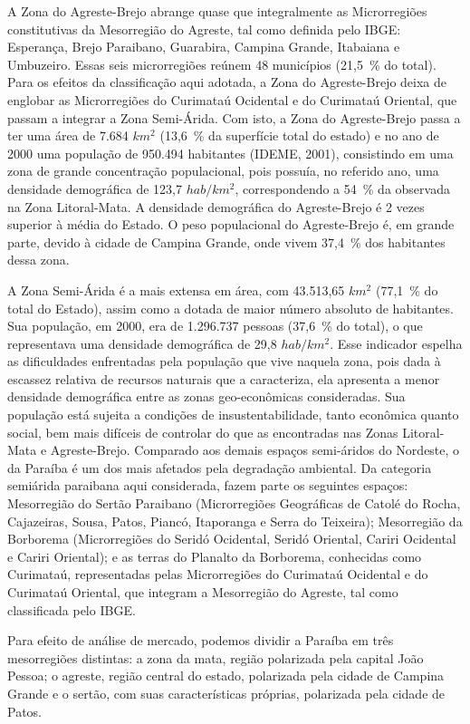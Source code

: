 	A Zona do Agreste-Brejo abrange quase que integralmente as Microrregiões constitutivas da Mesorregião do Agreste, tal como definida pelo IBGE: Esperança, Brejo Paraibano, Guarabira, Campina Grande, Itabaiana e Umbuzeiro. Essas seis microrregiões reúnem 48 municípios (21,5~\% do total). Para os efeitos da classificação aqui adotada, a Zona do Agreste-Brejo deixa de englobar as Microrregiões do Curimataú Ocidental e do Curimataú Oriental, que passam a integrar a Zona Semi-Árida. Com isto, a Zona do Agreste-Brejo passa a ter uma área de 7.684 $km^2$ (13,6~\% da superfície total do estado) e no ano de 2000 uma população de 950.494 habitantes (IDEME, 2001), consistindo em uma zona de grande concentração populacional, pois possuía, no referido ano, uma densidade demográfica de 123,7 $hab/km^2$, correspondendo a 54~\% da observada na Zona Litoral-Mata. A densidade demográfica do Agreste-Brejo é 2 vezes superior à média do Estado. O peso populacional do Agreste-Brejo é, em grande parte, devido à cidade de Campina Grande, onde vivem 37,4~\% dos habitantes dessa zona.

	A Zona Semi-Árida é a mais extensa em área, com 43.513,65 $km^2$ (77,1~\% do total do Estado), assim como a dotada de maior número absoluto de habitantes. Sua população, em 2000, era de 1.296.737 pessoas (37,6~\% do total), o que representava uma densidade demográfica de 29,8 $hab/km^2$. Esse indicador espelha as dificuldades enfrentadas pela população que vive naquela zona, pois dada à escassez relativa de recursos naturais que a caracteriza, ela apresenta a menor densidade demográfica entre as zonas geo-econômicas consideradas. Sua população está sujeita a condições de insustentabilidade, tanto econômica quanto social, bem mais difíceis de controlar do que as encontradas nas Zonas Litoral-Mata e Agreste-Brejo. Comparado aos demais espaços semi-áridos do Nordeste, o da Paraíba é um dos mais afetados pela degradação ambiental. Da categoria semiárida paraibana aqui considerada, fazem parte os seguintes espaços: Mesorregião do Sertão Paraibano (Microrregiões Geográficas de Catolé do Rocha, Cajazeiras, Sousa, Patos, Piancó, Itaporanga e Serra do Teixeira); Mesorregião da Borborema (Microrregiões do Seridó Ocidental, Seridó Oriental, Cariri Ocidental e Cariri Oriental); e as terras do Planalto da Borborema, conhecidas como Curimataú, representadas pelas Microrregiões do Curimataú Ocidental e do Curimataú Oriental, que integram a Mesorregião do Agreste, tal como classificada pelo IBGE.

	Para efeito de análise de mercado, podemos dividir a Paraíba em três mesorregiões distintas: a zona da mata, região polarizada pela capital João Pessoa; o agreste, região central do estado, polarizada pela cidade de Campina Grande e o sertão, com suas características próprias, polarizada pela cidade de Patos.

